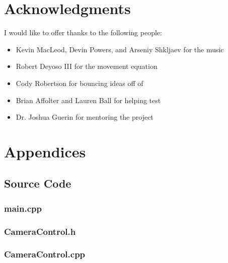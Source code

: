 \documentclass{article}
\begin{document}
\section{Acknowledgments} \label{sec:acknowledge}

I would like to offer thanks to the following people:

\begin{itemize}
	\item Kevin MacLeod, Devin Powers, and Arseniy Shkljaev for the music
	\item Robert Deyoso III for the movement equation
	\item Cody Robertson for bouncing ideas off of
	\item Brian Affolter and Lauren Ball for helping test
	\item Dr. Joshua Guerin for mentoring the project
\end{itemize}

\pagebreak

\section{Appendices} \label{sec:appendices}

\subsection{Source Code} \label{subsec:source}

\subsubsection{main.cpp}
	
 				
\subsubsection{CameraControl.h}
	

\subsubsection{CameraControl.cpp}
	
					
\end{document}

